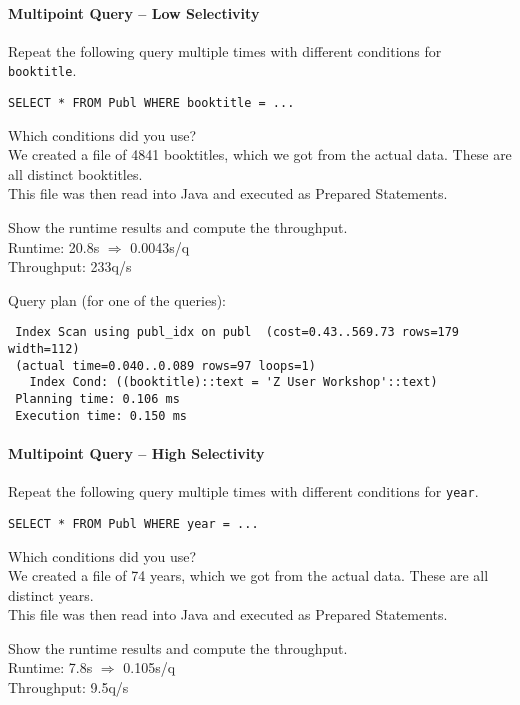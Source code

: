 \documentclass[11pt]{scrartcl}
\begin{document}
\paragraph{Multipoint Query -- Low Selectivity}

Repeat the following query multiple times with different conditions for {\tt booktitle}.

{\small
\begin{verbatim}
SELECT * FROM Publ WHERE booktitle = ...
\end{verbatim}
}

\noindent
Which conditions did you use?\\
We created a file of 4841 booktitles, which we got from the actual data. These are all distinct booktitles.\\
This file was then read into Java and executed as Prepared Statements.

\smallskip\noindent
Show the runtime results and compute the throughput.\\
Runtime: 20.8s $\Rightarrow$ 0.0043s/q\\
Throughput: 233q/s

\smallskip\noindent
Query plan (for one of the queries):
{\small
\begin{verbatim}
 Index Scan using publ_idx on publ  (cost=0.43..569.73 rows=179 width=112)
 (actual time=0.040..0.089 rows=97 loops=1)
   Index Cond: ((booktitle)::text = 'Z User Workshop'::text)
 Planning time: 0.106 ms
 Execution time: 0.150 ms
\end{verbatim}
}


\paragraph{Multipoint Query -- High Selectivity}

Repeat the following query multiple times with different conditions for {\tt year}.

{\small
\begin{verbatim}
SELECT * FROM Publ WHERE year = ...
\end{verbatim}
}

\noindent
Which conditions did you use?\\
We created a file of 74 years, which we got from the actual data. These are all distinct years.\\
This file was then read into Java and executed as Prepared Statements.

\smallskip\noindent
Show the runtime results and compute the throughput.\\
Runtime: 7.8s $\Rightarrow$ 0.105s/q\\
Throughput: 9.5q/s
\end{document}
